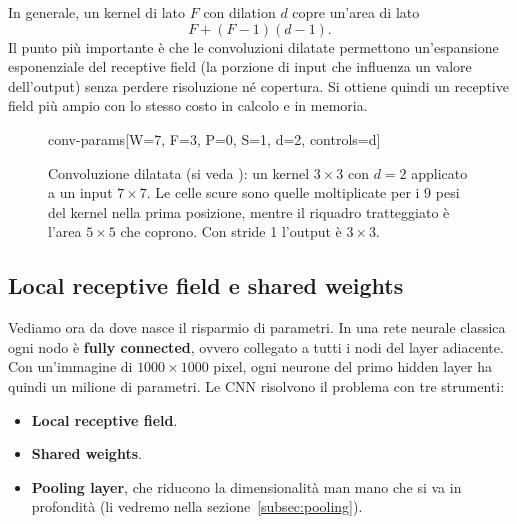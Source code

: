 In generale, un kernel di lato $F$ con dilation $d$ copre un'area di lato
\[
F + (F - 1)(d - 1).
\]
Il punto più importante è che le convoluzioni dilatate permettono un'espansione esponenziale del receptive field (la porzione di input che influenza un valore dell'output) senza perdere risoluzione né copertura. Si ottiene quindi un receptive field più ampio con lo stesso costo in calcolo e in memoria.

\begin{figure}[htbp]
\centering
\begin{widget}{conv-params}[W=7, F=3, P=0, S=1, d=2, controls={d}]
\end{widget}
\caption{Convoluzione dilatata (si veda \cite{Dumoulin2016}): un kernel $3 \times 3$ con $d = 2$ applicato a un input $7 \times 7$. Le celle scure sono quelle moltiplicate per i 9 pesi del kernel nella prima posizione, mentre il riquadro tratteggiato è l'area $5 \times 5$ che coprono. Con stride 1 l'output è $3 \times 3$.}
\label{fig:dilation}
\end{figure}

\subsection{Local receptive field e shared weights}
Vediamo ora da dove nasce il risparmio di parametri. In una rete neurale classica ogni nodo è \textbf{fully connected}, ovvero collegato a tutti i nodi del layer adiacente. Con un'immagine di $1000 \times 1000$ pixel, ogni neurone del primo hidden layer ha quindi un milione di parametri. Le CNN risolvono il problema con tre strumenti:
\begin{itemize}
    \item \textbf{Local receptive field}.
    \item \textbf{Shared weights}.
    \item \textbf{Pooling layer}, che riducono la dimensionalità man mano che si va in profondità (li vedremo nella sezione~\ref{subsec:pooling}).
\end{itemize}

